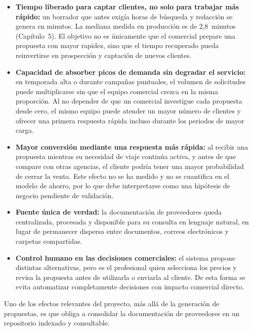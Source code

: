 \begin{itemize}

\item \textbf{Tiempo liberado para captar clientes, no solo para trabajar más rápido:}
un borrador que antes exigía horas de búsqueda y redacción se genera en minutos. La
mediana medida en producción es de 2,8~minutos (Capítulo~5). El objetivo no es únicamente
que el comercial prepare una propuesta con mayor rapidez, sino que el tiempo recuperado
pueda reinvertirse en prospección y captación de nuevos clientes.

\item \textbf{Capacidad de absorber picos de demanda sin degradar el servicio:}
en temporada alta o durante campañas puntuales, el volumen de solicitudes puede
multiplicarse sin que el equipo comercial crezca en la misma proporción. Al no depender
de que un comercial investigue cada propuesta desde cero, el mismo equipo puede atender
un mayor número de clientes y ofrecer una primera respuesta rápida incluso durante los
periodos de mayor carga.

\item \textbf{Mayor conversión mediante una respuesta más rápida:}
al recibir una propuesta mientras su necesidad de viaje continúa activa, y antes de que
compare con otras agencias, el cliente podría tener una mayor probabilidad de cerrar la
venta. Este efecto no se ha medido y no se cuantifica en el modelo de ahorro, por lo que
debe interpretarse como una hipótesis de negocio pendiente de validación.

\item \textbf{Fuente única de verdad:}
la documentación de proveedores queda centralizada, procesada y disponible para su
consulta en lenguaje natural, en lugar de permanecer dispersa entre documentos,
correos electrónicos y carpetas compartidas.

\item \textbf{Control humano en las decisiones comerciales:}
el sistema propone distintas alternativas, pero es el profesional quien selecciona los
precios y revisa la propuesta antes de utilizarla o enviarla al cliente. De esta forma se
evita automatizar completamente decisiones con impacto comercial directo.

\end{itemize}


Uno de los efectos relevantes del proyecto, más allá de la generación de propuestas, es
que obliga a consolidar la documentación de proveedores en un repositorio indexado y
consultable.

